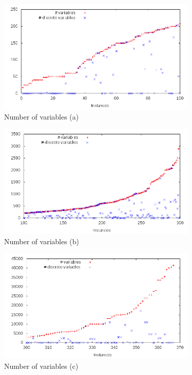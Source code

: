 \begin{figure}\centering
  \includegraphics[width=0.85\textwidth]{pic_var_small.png}
  \caption{Number of variables (a) \label{fig:pic_var_small}}
\end{figure}

\begin{figure}\centering
  \includegraphics[width=0.85\textwidth]{pic_var_medium.png}
  \caption{Number of variables (b) \label{fig:pic_var_medium}}
\end{figure}

\begin{figure}\centering
  \includegraphics[width=0.85\textwidth]{pic_var_big.png}
  \caption{Number of variables (c) \label{fig:pic_var_large}}
\end{figure}

